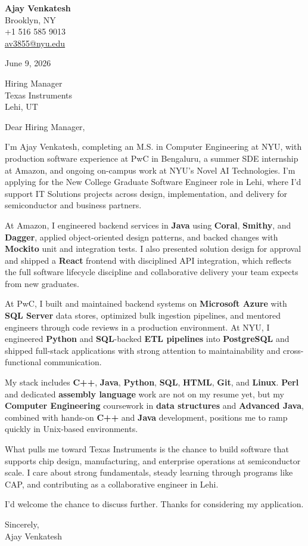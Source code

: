 \documentclass[letterpaper,11pt]{article}
\begin{document}
\begin{flushleft}
\textbf{\large Ajay Venkatesh} \\
Brooklyn, NY \\
+1 516 585 9013 \\
\href{mailto:av3855@nyu.edu}{av3855@nyu.edu}
\end{flushleft}
\vspace{10pt}
June 9, 2026
\vspace{6pt}

Hiring Manager \\
Texas Instruments \\
Lehi, UT

\vspace{10pt}

Dear Hiring Manager,

I'm Ajay Venkatesh, completing an M.S. in Computer Engineering at NYU, with production software experience at PwC in Bengaluru, a summer SDE internship at Amazon, and ongoing on-campus work at NYU's Novel AI Technologies. I'm applying for the New College Graduate Software Engineer role in Lehi, where I'd support IT Solutions projects across design, implementation, and delivery for semiconductor and business partners.

At Amazon, I engineered backend services in \textbf{Java} using \textbf{Coral}, \textbf{Smithy}, and \textbf{Dagger}, applied object-oriented design patterns, and backed changes with \textbf{Mockito} unit and integration tests. I also presented solution design for approval and shipped a \textbf{React} frontend with disciplined API integration, which reflects the full software lifecycle discipline and collaborative delivery your team expects from new graduates.

At PwC, I built and maintained backend systems on \textbf{Microsoft Azure} with \textbf{SQL Server} data stores, optimized bulk ingestion pipelines, and mentored engineers through code reviews in a production environment. At NYU, I engineered \textbf{Python} and \textbf{SQL}-backed \textbf{ETL pipelines} into \textbf{PostgreSQL} and shipped full-stack applications with strong attention to maintainability and cross-functional communication.

My stack includes \textbf{C++}, \textbf{Java}, \textbf{Python}, \textbf{SQL}, \textbf{HTML}, \textbf{Git}, and \textbf{Linux}. \textbf{Perl} and dedicated \textbf{assembly language} work are not on my resume yet, but my \textbf{Computer Engineering} coursework in \textbf{data structures} and \textbf{Advanced Java}, combined with hands-on \textbf{C++} and \textbf{Java} development, positions me to ramp quickly in Unix-based environments.

What pulls me toward Texas Instruments is the chance to build software that supports chip design, manufacturing, and enterprise operations at semiconductor scale. I care about strong fundamentals, steady learning through programs like CAP, and contributing as a collaborative engineer in Lehi.

I'd welcome the chance to discuss further. Thanks for considering my application.

\vspace{12pt}
Sincerely, \\
Ajay Venkatesh
\end{document}
